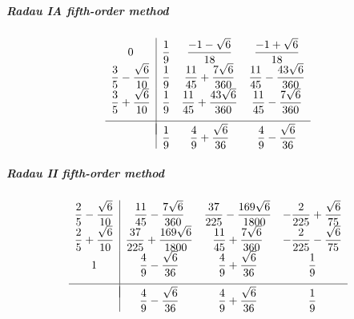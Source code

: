 \subparagraph{Radau IA fifth-order method}
\begin{equation}
	\begin{array}{c|ccc}
		0   & \dfrac{1}{9} & \dfrac{-1 - \sqrt{6}}{18} & \dfrac{-1 + \sqrt{6}}{18} \\
		\dfrac{3}{5} - \dfrac{\sqrt{6}}{10}  & \dfrac{1}{9} & \dfrac{11}{45} + \dfrac{7\sqrt{6}}{360} & \dfrac{11}{45} - \dfrac{43\sqrt{6}}{360}\\
		\dfrac{3}{5} + \dfrac{\sqrt{6}}{10} & \dfrac{1}{9} & \dfrac{11}{45} + \dfrac{43\sqrt{6}}{360} & \dfrac{11}{45} - \dfrac{7\sqrt{6}}{360} 
		\\[1em]
		\hline
		\\[-1em]
		& \dfrac{1}{9} & \dfrac{4}{9} + \dfrac{\sqrt{6}}{36} & \dfrac{4}{9} - \dfrac{\sqrt{6}}{36}  \\
	\end{array}
	\label{eq::radauia}
\end{equation}

\subparagraph{Radau II fifth-order method}
\begin{equation}
	\begin{array}{c|ccc}
		\dfrac{2}{5} - \dfrac{\sqrt{6}}{10}   & \dfrac{11}{45} - \dfrac{7\sqrt{6}}{360} & \dfrac{37}{225} - \dfrac{169\sqrt{6}}{1800} & -\dfrac{2}{225} + \dfrac{\sqrt{6}}{75} \\
		\dfrac{2}{5} + \dfrac{\sqrt{6}}{10}  & \dfrac{37}{225} + \dfrac{169\sqrt{6}}{1800} & \dfrac{11}{45} + \dfrac{7\sqrt{6}}{360} & -\dfrac{2}{225} - \dfrac{\sqrt{6}}{75}\\
		1                   & \dfrac{4}{9} - \dfrac{\sqrt{6}}{36} & \dfrac{4}{9} + \dfrac{\sqrt{6}}{36} & \dfrac{1}{9}
		\\[1em]
		\hline
		\\[-1em]
		& \dfrac{4}{9} - \dfrac{\sqrt{6}}{36} & \dfrac{4}{9} + \dfrac{\sqrt{6}}{36} & \dfrac{1}{9}  \\
	\end{array}
	\label{eq::radauiia}
\end{equation}

